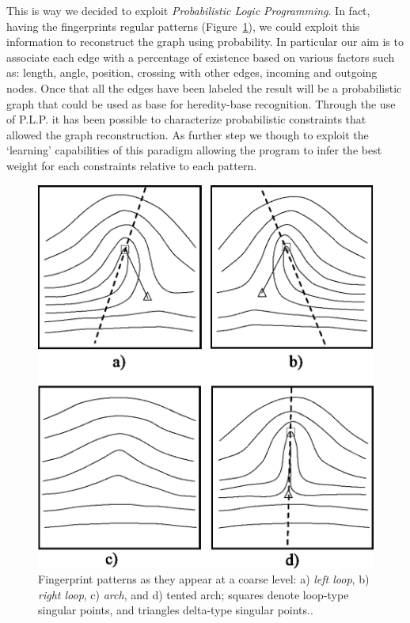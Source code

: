 \documentclass[8pt]{article}
\begin{document}
    This is way we decided to exploit \textit{Probabilistic Logic Programming}.
   	In fact, having the fingerprints regular patterns (Figure~\ref{fig:patterns}), we could exploit this information to reconstruct the graph using probability.
   	In particular our aim is to associate each edge with a percentage of existence based on various factors such as: length, angle, position, crossing with other edges, incoming and outgoing nodes.
   	Once that all the edges have been labeled the result will be a probabilistic graph that could be used as base for heredity-base recognition.
   	Through the use of P.L.P. it has been possible to characterize probabilistic constraints that allowed the graph reconstruction.
   	As further step we though to exploit the \textquoteleft learning' capabilities of this paradigm allowing the program to infer the best weight for each constraints relative to each pattern.

    \begin{figure}
		\centering
		\includegraphics[width=0.6\linewidth]{img/patterns}
		\caption{Fingerprint patterns as they appear at a coarse level: a) \textit{left loop}, b) \textit{right loop}, c) \textit{\textit{arch}}, and d) tented arch; squares denote loop-type singular points, and triangles
			delta-type singular points..}
		\label{fig:patterns}
	\end{figure}%





\end{document}
